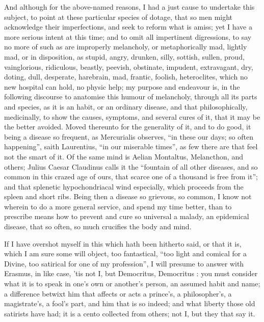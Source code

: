 And although for the above-named reasons, I had a just cause to undertake this
subject, to point at these particular species of dotage, that so men might
acknowledge their imperfections, and seek to reform what is amiss; yet I have a
more serious intent at this time; and to omit all impertinent digressions, to
say no more of such as are improperly melancholy, or metaphorically mad,
lightly mad, or in disposition, as stupid, angry, drunken, silly, sottish,
sullen, proud, vainglorious, ridiculous, beastly, peevish, obstinate, impudent,
extravagant, dry, doting, dull, desperate, harebrain, \etc{} mad, frantic,
foolish, heteroclites, which no new hospital can hold, no
physic help; my purpose and endeavour is, in the following discourse to
anatomise this humour of melancholy, through all its parts and species, as it
is an habit, or an ordinary disease, and that philosophically, medicinally, to
show the causes, symptoms, and several cures of it, that it may be the better
avoided. Moved thereunto for the generality of it, and to do good, it being a
disease so frequent, as Mercurialis observes, \enquote{in these our
days; so often happening}, saith Laurentius, \enquote{in our
miserable times}, as few there are that feel not the smart of it. Of the same
mind is Aelian Montaltus, Melancthon, and others;
Julius Caesar Claudinus calls it the \enquote{fountain of all other
diseases, and so common in this crazed age of ours, that scarce one of a
thousand is free from it}; and that splenetic hypochondriacal wind especially,
which proceeds from the spleen and short ribs. Being then a disease so
grievous, so common, I know not wherein to do a more general service, and spend
my time better, than to prescribe means how to prevent and cure so universal a
malady, an epidemical disease, that so often, so much crucifies the body and
mind.

If I have overshot myself in this which hath been hitherto said, or that it is,
which I am sure some will object, too fantastical, \enquote{too light and comical for a
Divine, too satirical for one of my profession}, I will presume to answer with
Erasmus, in like case, 'tis not I, but Democritus,
Democritus : you must consider what it is to speak in one's own or
another's person, an assumed habit and name; a difference betwixt him that
affects or acts a prince's, a philosopher's, a magistrate's, a fool's part, and
him that is so indeed; and what liberty those old satirists have had; it is a
cento collected from others; not I, but they that say it.

